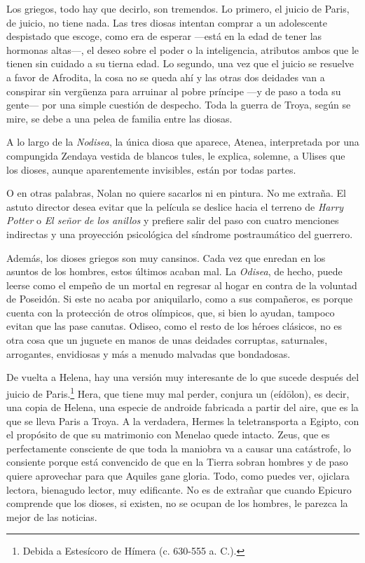Los griegos, todo hay que decirlo, son tremendos. Lo primero, el juicio de Paris, de juicio, no tiene nada. Las tres diosas intentan comprar a un adolescente despistado que escoge, como era de esperar ---está en la edad de tener las hormonas altas---, el deseo sobre el poder o la inteligencia, atributos ambos que le tienen sin cuidado a su tierna edad. Lo segundo, una vez que el juicio se resuelve a favor de Afrodita, la cosa no se queda ahí y las otras dos deidades van a conspirar sin vergüenza para arruinar al pobre príncipe ---y de paso a toda su gente--- por una simple cuestión de despecho. Toda la guerra de Troya, según se mire, se debe a una pelea de familia entre las diosas.

A lo largo de la \emph{Nodisea}, la única diosa que aparece, Atenea, interpretada por una compungida Zendaya vestida de blancos tules, le explica, solemne, a Ulises que los dioses, aunque aparentemente invisibles, están por todas partes.

O en otras palabras, Nolan no quiere sacarlos ni en pintura. No me extraña. El astuto director desea evitar que la película se deslice hacia el terreno de \emph{Harry Potter} o \emph{El señor de los anillos} y prefiere salir del paso con cuatro menciones indirectas y una proyección psicológica del síndrome postraumático del guerrero.

Además, los dioses griegos son muy cansinos. Cada vez que enredan en los asuntos de los hombres, estos últimos acaban mal. La \emph{Odisea}, de hecho, puede leerse como el empeño de un mortal en regresar al hogar en contra de la voluntad de Poseidón. Si este no acaba por aniquilarlo, como a sus compañeros, es porque cuenta con la protección de otros olímpicos, que, si bien lo ayudan, tampoco evitan que las pase canutas. Odiseo, como el resto de los héroes clásicos, no es otra cosa que un juguete en manos de unas deidades corruptas, saturnales, arrogantes, envidiosas y más a menudo malvadas que bondadosas.

De vuelta a Helena, hay una versión muy interesante de lo que sucede después del juicio de Paris.\footnote{Debida a Estesícoro de Hímera (c. 630-555 a. C.).} Hera, que tiene muy mal perder, conjura un  (eídōlon), es decir, una copia de Helena, una especie de androide fabricada a partir del aire, que es la que se lleva Paris a Troya. A la verdadera, Hermes la teletransporta a Egipto, con el propósito de que su matrimonio con Menelao quede intacto. Zeus, que es perfectamente consciente de que toda la maniobra va a causar una catástrofe, lo consiente porque está convencido de que en la Tierra sobran hombres y de paso quiere aprovechar para que Aquiles gane gloria. Todo, como puedes ver, ojiclara lectora, bienagudo lector, muy edificante. No es de extrañar que cuando Epicuro comprende que los dioses, si existen, no se ocupan de los hombres, le parezca la mejor de las noticias.

